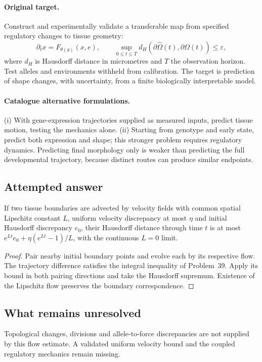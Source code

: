 \documentclass[11pt]{article}
\begin{document}
\paragraph{Original target.}
Construct and experimentally validate a transferable map from specified regulatory changes to tissue geometry:
\[
\partial_t x=F_{\theta(g)}(x,e),\qquad
\sup_{0\leq t\leq T}d_H(\partial\widehat\Omega(t),\partial\Omega(t))\leq\varepsilon,
\]
where $d_H$ is Hausdorff distance in micrometres and $T$ the observation horizon. Test alleles and environments withheld from calibration. The target is prediction of shape changes, with uncertainty, from a finite biologically interpretable model.
\paragraph{Catalogue alternative formulations.}
(i) With gene-expression trajectories supplied as measured inputs, predict tissue motion, testing the mechanics alone. (ii) Starting from genotype and early state, predict both expression and shape; this stronger problem requires regulatory dynamics. Predicting final morphology only is weaker than predicting the full developmental trajectory, because distinct routes can produce similar endpoints.
\subsection{Attempted answer}
\begin{proposition}
If two tissue boundaries are advected by velocity fields with common spatial Lipschitz constant $L$, uniform velocity discrepancy at most $\eta$ and initial Hausdorff discrepancy $e_0$, their Hausdorff distance through time $t$ is at most $e^{Lt}e_0+\eta(e^{Lt}-1)/L$, with the continuous $L=0$ limit.
\end{proposition}
\begin{proof}
Pair nearby initial boundary points and evolve each by its respective flow. The trajectory difference satisfies the integral inequality of Problem~39. Apply its bound in both pairing directions and take the Hausdorff supremum. Existence of the Lipschitz flow preserves the boundary correspondence.
\end{proof}
\subsection{What remains unresolved}
Topological changes, divisions and allele-to-force discrepancies are not supplied by this flow estimate. A validated uniform velocity bound and the coupled regulatory mechanics remain missing.
\end{document}
